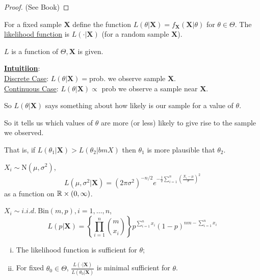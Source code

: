 \documentclass[english, 11pt]{article}
\begin{document}
\begin{proof}
(See Book)
\end{proof}

\begin{defn}\label{defn:224}
For a fixed sample $\bm{X}$ define the function $L(\theta|\bm{X})=f_{\bm{X}}(\bm{X}|\theta)$ for $\theta\in \Theta$. The \underline{likelihood function} is $L(\cdot|\bm{X})$ (for a random sample $\bm{X}$).
\end{defn}

\begin{note}
$L$ is a function of $\Theta, \bm{X}$ is given.
\end{note}

\underline{\textbf{Intuitiion}}:\\
\underline{Discrete Case}: $L(\theta|\bm{X})=$prob. we observe sample $\bm{X}$.\\
\underline{Continuous Case}: $L(\theta|\bm{X})\propto$ prob we observe a sample near $\bm{X}$.


So $L(\theta|\bm{X})$ says something about how likely is our sample for a value of $\theta$.


So it tells us which values of $\theta$ are more (or less) likely to give rise to the sample we observed. 

That is, if $L(\theta_1|\bm{X})>L(\theta_2|bm{X})$ then $\theta_1$ is more plausible that $\theta_2$.

\begin{exmp}
$X_i\sim\text{N}(\mu, \sigma^2)$, 
$$
L(\mu, \sigma^2|\bm{X})=(2\pi\sigma^2)^{-n/2}e^{-\frac{1}{2}\sum_{i=1}^n\left(\frac{X_i-\mu}{\sigma}\right)^2}
$$
as a function on ${\mathbb{R}}\times(0, \infty)$.
\end{exmp}
\begin{exmp}
$X_i\sim i.i.d.~\text{Bin}(m, p), i=1, \dots, n$, 
$$
L(p|\bm{X})=\left\{\prod_{i=1}^n\binom{m}{x_i}\right\}p^{\sum_{i=1}^nx_i}(1-p)^{nm-\sum_{i=1}^nx_i}
$$
\end{exmp}

\begin{thrm}\label{thrm:225}
\begin{enumerate}[i).]
\item The likelihood function is sufficient for $\theta$;
\item For fixed $\theta_0\in\Theta$, $\frac{L(\cdot|\bm{X})}{L(\theta_0|\bm{X})}$ is minimal sufficient for $\theta$.
\end{enumerate}
\end{thrm}
\end{document}
